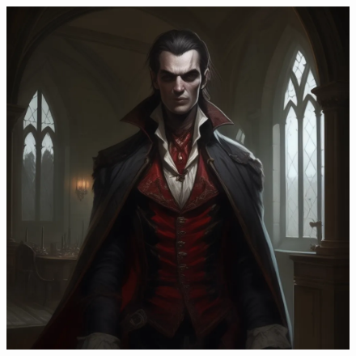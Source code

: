 
\begin{figure}[h]
\begin{center}
\includegraphics[scale=0.24]{img/ai-images/vampire.png}
\end{center}
\end{figure}
